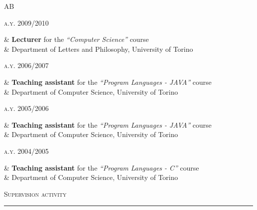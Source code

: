 \documentclass[a4paper,10pt]{article}
\newcommand{\mediumtitle}[1]{
	\vspace{0.2cm}
	{\noindent
	\Large \textsc{#1}\\[-2ex]
	\hrule
	\vspace{0.2cm}}
}
\newenvironment{doubletablelist}
{
	\vspace{-0.2cm}
	\begin{longtable}[!h]{AB}}{\end{longtable}
}
\newcommand{\dtlist}[2]{
\hspace{-3cm}
\noindent
	\begin{minipage}{0.24\textwidth}
	\begin{flushright}
	\textsc{#1}
	\end{flushright}
	\end{minipage}
	& #2\\[0.2cm]
}
\begin{document}
\newpage

\begin{doubletablelist}
	\dtlist{a.y. 2009/2010}{\textbf{Lecturer} for the \emph{``Computer Science''} course \\ 
							& \hskip0.5cm Department of Letters and Philosophy, University of Torino}
	\dtlist{a.y. 2006/2007}{\textbf{Teaching assistant} for the \emph{``Program Languages - JAVA''} course \\ 
							& \hskip0.5cm Department of Computer Science, University of Torino}
	\dtlist{a.y. 2005/2006}{\textbf{Teaching assistant} for the \emph{``Program Languages - JAVA''} course \\ 
							&  \hskip0.5cm Department of Computer Science, University of Torino}
	\dtlist{a.y. 2004/2005}{\textbf{Teaching assistant}  for the \emph{``Program Languages - C''} course \\ 
							&  \hskip0.5cm Department of Computer Science, University of Torino}
\end{doubletablelist}



\mediumtitle{Supervision activity}
\end{document}
